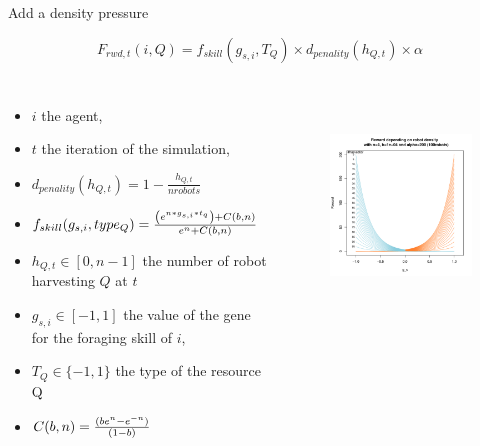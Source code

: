 \documentclass[8pt,handout,notes=show]{beamer}
\begin{document}
\begin{frame}{Add a density pressure}\addtocounter{framenumber}{-1}

$$F_{rwd,t}(i,Q) = f_{skill}\left(g_{s,i},T_Q\right)\times d_{penality}\left(h_{Q,t}\right)\times \alpha$$

\begin{columns}



 	\begin{itemize}
 		\item $i$ the agent,
 		\item $t$ the iteration of the simulation,
 		\item $ d_{penality}(h_{Q,t}) =  1 - \frac {h_{Q,t}} {nrobots} $
 		\item $ f_{skill}(g_{s,i},type_Q)= {\left(e^{n*g_{s,i}*t_q}\right)+C(b,n) \over {e^{n}+C(b,n)}}$
 		\item $h_{Q,t} \in [0, n -1]$ the number of robot harvesting $Q$ at $t$ 
 		\item $g_{s,i} \in [-1,1]$ the value of the gene for the foraging skill of $i$,
 		\item $T_Q\in \{-1,1\}$ the type of the resource Q
 		\item $ C(b,n) = {(be^{n} - e^{-n} )\over{(1-b)}} $
 	\end{itemize}








\begin{figure}
\includegraphics[height=6cm]{images/densite}
\end{figure}


\end{columns}


\end{frame}
\end{document}
